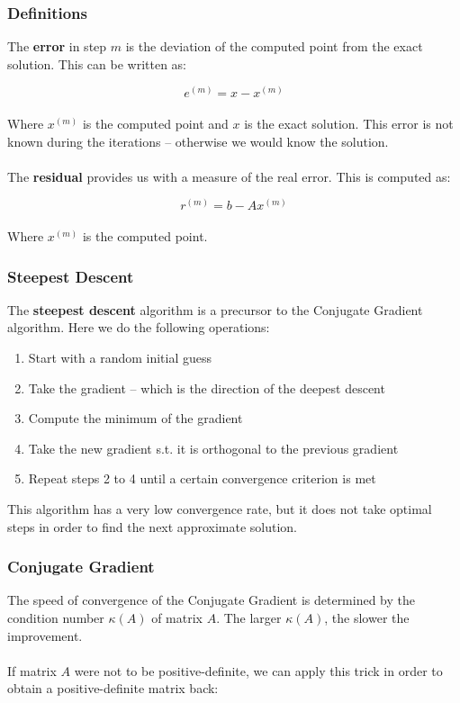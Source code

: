\documentclass{article}
\begin{document}
\subsubsection{Definitions}
The \textbf{error} in step $m$ is the deviation of the computed point from the exact solution. This can be written as:

\[ e^{(m)} = x-x^{(m)} \] \\
Where $x^{(m)}$ is the computed point and $x$ is the exact solution. This error is not known during the iterations -- otherwise we would know the solution. \\ \\
The \textbf{residual} provides us with a measure of the real error. This is computed as:

\[ r^{(m)} = b-Ax^{(m)} \] \\
Where $x^{(m)}$ is the computed point.

\subsubsection{Steepest Descent}
The \textbf{steepest descent} algorithm is a precursor to the Conjugate Gradient algorithm. Here we do the following operations:

\begin{enumerate}
	\item Start with a random initial guess
	\item Take the gradient -- which is the direction of the deepest descent
	\item Compute the minimum of the gradient
	\item Take the new gradient s.t. it is orthogonal to the previous gradient
	\item Repeat steps 2 to 4 until a certain convergence criterion is met
\end{enumerate}
This algorithm has a very low convergence rate, but it does not take optimal steps in order to find the next approximate solution.

\subsubsection{Conjugate Gradient}
The speed of convergence of the Conjugate Gradient is determined by the condition number $\kappa(A)$ of matrix $A$. The larger $\kappa(A)$, the slower the improvement. \\ \\
If matrix $A$ were not to be positive-definite, we can apply this trick in order to obtain a positive-definite matrix back:
\end{document}
